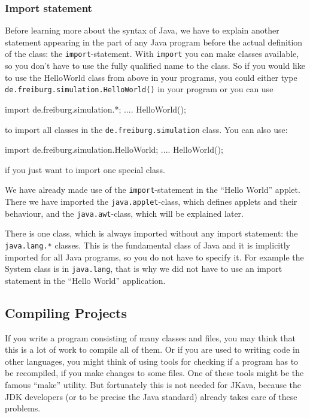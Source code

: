\subsubsection{Import statement}
Before learning more about the syntax of Java, we have to explain another
statement appearing in the part of any Java program before the actual
definition of the class: the \verb|import|-statement. With \verb|import|
you can make classes available, so you don't have to use the fully
qualified name to the class. So if you would like to
use the HelloWorld class from above in your programs, you could either
type \verb|de.freiburg.simulation.HelloWorld()| in your program
or you can use
\begin{sverbatim}
import de.freiburg.simulation.*;
....
   HelloWorld();
\end{sverbatim}
to import all classes in the \verb|de.freiburg.simulation| class.
You can also use:
\begin{sverbatim}
import de.freiburg.simulation.HelloWorld;
....
   HelloWorld();
\end{sverbatim}
if you just want to import one special class.

We have already made use of the \verb|import|-statement in the ``Hello World'' 
applet. There we have imported the \verb|java.applet|-class, which
defines applets and their behaviour, and the \verb|java.awt|-class, which
will be explained later.
 
There is one class, which is always imported without any import statement:
the \verb|java.lang.*| classes. This is the fundamental class of Java and it is
implicitly imported for all Java programs, so you do not have to specify
it. For example the System class is in \verb|java.lang|, that is why
we did not have to use an import statement in the ``Hello World''
application.  


\subsection{Compiling Projects}
If you write a program consisting of many classes and files, you
may think that this is a lot of work to compile all of them. Or if
you are used to writing code in other languages, you might think
of using tools for checking if a program has to be recompiled, if you make
changes to some files. One of these tools might be the famous ``make''
utility. But fortunately this is not needed for JKava, because
the JDK developers (or to be precise the Java standard) already
takes care of these problems. 

